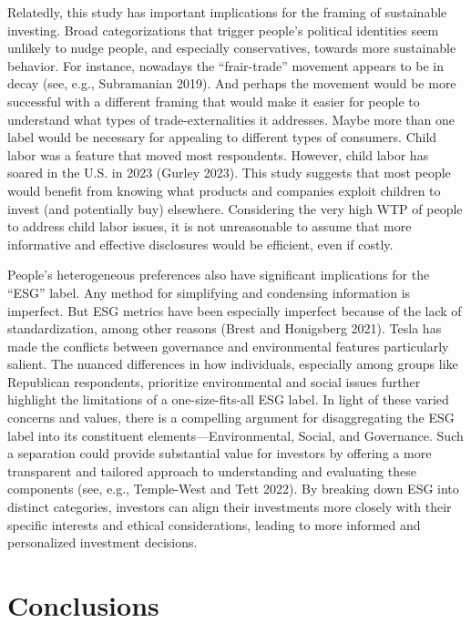 \documentclass[
  12pt,
]{article}
\begin{document}
Relatedly, this study has important implications for the framing of sustainable investing. Broad categorizations that trigger people's political identities seem unlikely to nudge people, and especially conservatives, towards more sustainable behavior. For instance, nowadays the ``frair-trade'' movement appears to be in decay (see, e.g., Subramanian 2019). And perhaps the movement would be more successful with a different framing that would make it easier for people to understand what types of trade-externalities it addresses. Maybe more than one label would be necessary for appealing to different types of consumers. Child labor was a feature that moved most respondents. However, child labor has soared in the U.S. in 2023 (Gurley 2023). This study suggests that most people would benefit from knowing what products and companies exploit children to invest (and potentially buy) elsewhere. Considering the very high WTP of people to address child labor issues, it is not unreasonable to assume that more informative and effective disclosures would be efficient, even if costly.

People's heterogeneous preferences also have significant implications for the ``ESG'' label. Any method for simplifying and condensing information is imperfect. But ESG metrics have been especially imperfect because of the lack of standardization, among other reasons (Brest and Honigsberg 2021). Tesla has made the conflicts between governance and environmental features particularly salient. The nuanced differences in how individuals, especially among groups like Republican respondents, prioritize environmental and social issues further highlight the limitations of a one-size-fits-all ESG label. In light of these varied concerns and values, there is a compelling argument for disaggregating the ESG label into its constituent elements---Environmental, Social, and Governance. Such a separation could provide substantial value for investors by offering a more transparent and tailored approach to understanding and evaluating these components (see, e.g., Temple-West and Tett 2022). By breaking down ESG into distinct categories, investors can align their investments more closely with their specific interests and ethical considerations, leading to more informed and personalized investment decisions.

\hypertarget{conclusions}{%
\section{Conclusions}\label{conclusions}}
\end{document}
